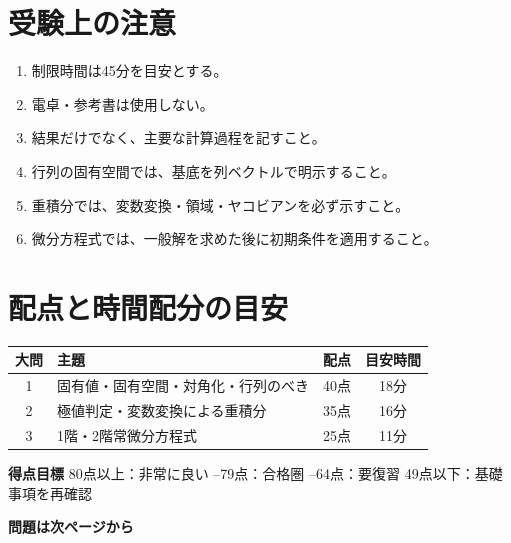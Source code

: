 \section*{受験上の注意}
\begin{examinfo}
\begin{enumerate}
  \item 制限時間は45分を目安とする。
  \item 電卓・参考書は使用しない。
  \item 結果だけでなく、主要な計算過程を記すこと。
  \item 行列の固有空間では、基底を列ベクトルで明示すること。
  \item 重積分では、変数変換・領域・ヤコビアンを必ず示すこと。
  \item 微分方程式では、一般解を求めた後に初期条件を適用すること。
\end{enumerate}
\end{examinfo}

\vspace{5mm}
\section*{配点と時間配分の目安}
\begin{center}
\begin{tabularx}{0.92\textwidth}{c X c c}
\toprule
大問 & 主題 & 配点 & 目安時間 \\
\midrule
1 & 固有値・固有空間・対角化・行列のべき & 40点 & 18分 \\
2 & 極値判定・変数変換による重積分 & 35点 & 16分 \\
3 & 1階・2階常微分方程式 & 25点 & 11分 \\
\bottomrule
\end{tabularx}
\end{center}

\vspace{6mm}
\begin{pointbox}
\textbf{得点目標}
\quad 80点以上：非常に良い --79点：合格圏 --64点：要復習 \quad 49点以下：基礎事項を再確認
\end{pointbox}

\vfill
\begin{center}
\Large\bfseries 問題は次ページから
\end{center}
\newpage
